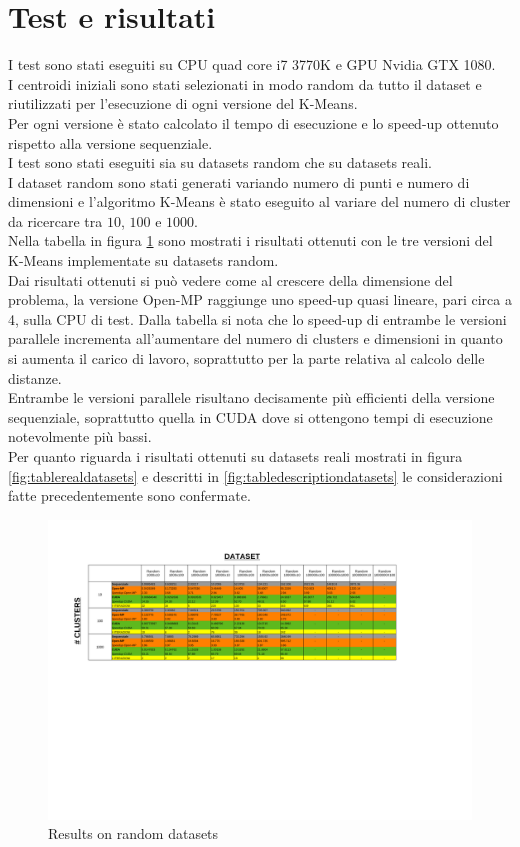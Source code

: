 \documentclass[10pt,twocolumn,letterpaper]{article}
\begin{document}
\section{Test e risultati}
I test sono stati eseguiti su CPU quad core i7 3770K e GPU Nvidia GTX 1080.\\
I centroidi iniziali sono stati selezionati in modo random da tutto il dataset e riutilizzati per l'esecuzione di ogni versione del K-Means.\\
Per ogni versione è stato calcolato il tempo di esecuzione e lo speed-up ottenuto rispetto alla versione sequenziale.\\
I test sono stati eseguiti sia su datasets random che su datasets reali.\\
I dataset random sono stati generati variando numero di punti e numero di dimensioni e l'algoritmo K-Means è stato eseguito al variare del numero di cluster da ricercare tra $10$, $100$ e $1000$.\\
Nella tabella in figura \ref{fig:tablerandomdatasets} sono mostrati i risultati ottenuti con le tre versioni del K-Means implementate su datasets random.\\
Dai risultati ottenuti si può vedere come al crescere della dimensione del problema, la versione Open-MP raggiunge uno speed-up quasi lineare, pari circa a 4, sulla CPU di test. Dalla tabella si nota che lo speed-up di entrambe le versioni parallele incrementa %
all'aumentare del numero di clusters e dimensioni in quanto si aumenta il carico di lavoro, soprattutto per la parte relativa al calcolo delle distanze.\\
Entrambe le versioni parallele risultano decisamente più efficienti della versione sequenziale, soprattutto quella in CUDA dove si ottengono tempi di esecuzione notevolmente più bassi.\\
Per quanto riguarda i risultati ottenuti su datasets reali mostrati in figura \ref{fig:tablerealdatasets} e descritti in \ref{fig:tabledescriptiondatasets} le considerazioni fatte precedentemente sono confermate.\\
\begin{figure}[h!]
	\centering
	\includegraphics[scale=0.7]{TableResults.pdf}
	\caption{Results on random datasets}
	\label{fig:tablerandomdatasets}
\end{figure}
\end{document}
